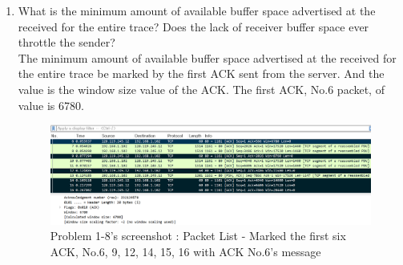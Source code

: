 \begin{enumerate}[label=\bfseries Problem \arabic*:,leftmargin=*,labelindent=1em]
        \item What is the minimum amount of available buffer space advertised at the received for the entire trace? Does the lack of receiver buffer space ever throttle the sender?\\[0.2mm]
        \soln The minimum amount of available buffer space advertised at the received for the entire trace be marked by the first ACK sent from the server. And the value is the window size value of the ACK. The first ACK, No.6 packet, of value is 6780.\\
        \vspace{-4mm}
        \begin{figure}[!h]\centering
        \hspace{15mm}  
    		\includegraphics[width=.8\textwidth]{image/week02/1-8-1.png}
    		\caption{\footnotesize Problem 1-8's screenshot : Packet List - Marked the first six ACK, No.6, 9, 12, 14, 15, 16 with ACK No.6’s message}
    		\vspace{-10pt}
        \end{figure}
        

\end{enumerate}
